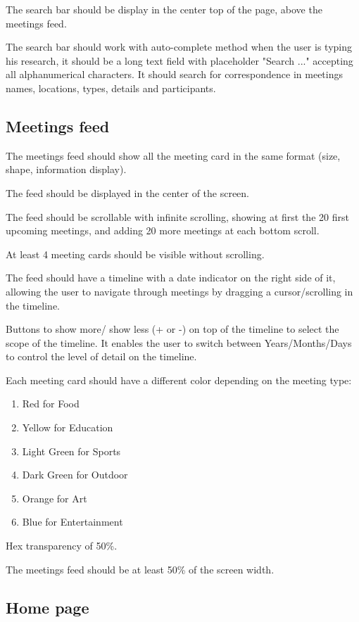 \documentclass[conference]{IEEEtran}
\begin{document}
The search bar should be display in the center top of the page, above the meetings feed.

The search bar should work with auto-complete method when the user is typing his research, it should be a long text field with placeholder "Search ..." accepting all alphanumerical characters. It should search for correspondence in meetings names, locations, types, details and participants.

\subsection{Meetings feed}

The meetings feed should show all the meeting card in the same format (size, shape, information display). 

The feed should be displayed in the center of the screen.

The feed should be scrollable with infinite scrolling, showing at first the 20 first upcoming meetings, and adding 20 more meetings at each bottom scroll.

At least 4 meeting cards should be visible without scrolling.

The feed should have a timeline with a date indicator on the right side of it, allowing the user to navigate through meetings by dragging a cursor/scrolling in the timeline.

Buttons to show more/ show less (+ or -) on top of the timeline to select the scope of the timeline. It enables the user to switch between Years/Months/Days to control the level of detail on the timeline.

Each meeting card should have a different color depending on the meeting type:

\begin{enumerate}
    \item Red for Food
    \item Yellow for Education
    \item Light Green for Sports
    \item Dark Green for Outdoor
    \item Orange for Art
    \item Blue for Entertainment
\end{enumerate}

Hex transparency of 50\%.

The meetings feed should be at least 50\% of the screen width.

\subsection{Home page}
\end{document}
